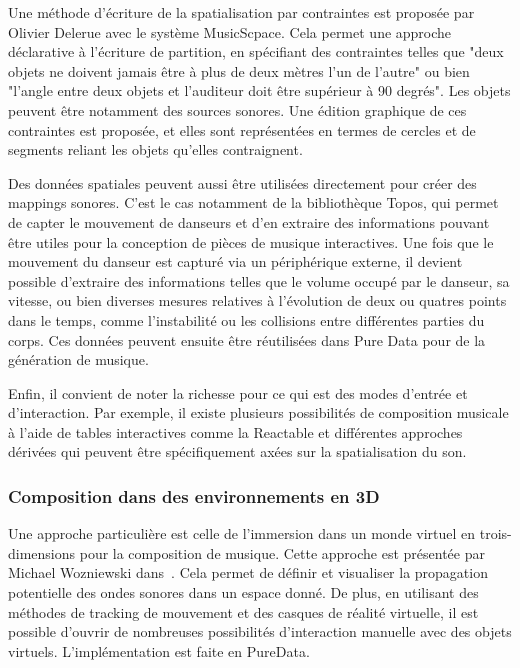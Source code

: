 \documentclass[french,12pt]{article}
\begin{document}
Une méthode d'écriture de la spatialisation par contraintes est proposée par Olivier Delerue avec le système MusicScpace\cite{delerue_spatialisation_2004}. Cela permet une approche déclarative à l'écriture de partition, en spécifiant des contraintes telles que "deux objets ne doivent jamais être à plus de deux mètres l'un de l'autre" ou bien "l'angle entre deux objets et l'auditeur doit être supérieur à 90 degrés". Les objets peuvent être notamment des sources sonores. Une édition graphique de ces contraintes est proposée, et elles sont représentées en termes de cercles et de segments reliant les objets qu'elles contraignent.

Des données spatiales peuvent aussi être utilisées directement pour créer des mappings sonores. C'est le cas notamment de la bibliothèque Topos\cite{naveda_topos_2014}, qui permet de capter le mouvement de danseurs et d'en extraire des informations pouvant être utiles pour la conception de pièces de musique interactives. Une fois que le mouvement du danseur est capturé via un périphérique externe, il devient possible d'extraire des informations telles que le volume occupé par le danseur, sa vitesse, ou bien diverses mesures relatives à l'évolution de deux ou quatres points dans le temps, comme l'instabilité ou les collisions entre différentes parties du corps. Ces données peuvent ensuite être réutilisées dans Pure Data pour de la génération de musique.

Enfin, il convient de noter la richesse pour ce qui est des modes d'entrée et d'interaction. Par exemple, il existe plusieurs possibilités de composition musicale à l'aide de tables interactives comme la Reactable\cite{kaltenbranner_reactable:_2006} et différentes approches dérivées qui peuvent être spécifiquement axées sur la spatialisation du son\cite{sasamoto_controlling_2013}.

\subsubsection{Composition dans des environnements en 3D}
Une approche particulière est celle de l'immersion dans un monde virtuel en trois-dimensions pour la composition de musique. Cette approche est présentée par Michael Wozniewski dans~\cite{wozniewski_framework_2006}. Cela permet de définir et visualiser la propagation potentielle des ondes sonores dans un espace donné. De plus, en utilisant des méthodes de tracking de mouvement et des casques de réalité virtuelle, il est possible d'ouvrir de nombreuses possibilités d'interaction manuelle avec des objets virtuels. L'implémentation est faite en PureData.
\end{document}
